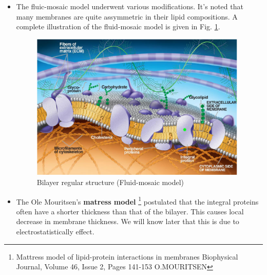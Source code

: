 \begin{itemize}
\item The fluic-mosaic model underwent various modifications. It's
  noted that many membranes are quite assymmetric in their lipid
  compositions. A complete illustration of the
  fluid-mosaic model is given in Fig. \ref{fig:fluid-mosaic-complete}.
  \begin{figure}[htb]
    \centerline{\includegraphics[height=7cm]{./images/fluid-mosaic-complete.eps}}
    \caption{Bilayer regular structure (Fluid-mosaic
      model)}\label{fig:fluid-mosaic-complete}
  \end{figure}

\item The Ole Mouritsen's {\bf matress model}
  \footnote{Mattress model of lipid-protein interactions in membranes
    Biophysical Journal, Volume 46, Issue 2, Pages 141-153
    O.MOURITSEN}
  postulated that the integral proteins often have a shorter thickness 
  than that of the bilayer. This causes local decrease in membrane
  thickness. We will know later that this is due to
  electrostatistically effect.  


\end{itemize}
